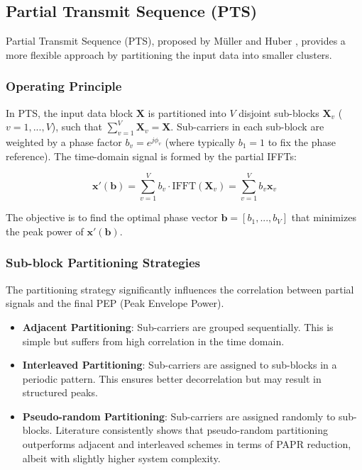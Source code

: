 \documentclass[12pt, a4paper, onecolumn]{article}
\begin{document}
\subsection{Partial Transmit Sequence (PTS)}
Partial Transmit Sequence (PTS), proposed by Müller and Huber \cite{ref6}, provides a more flexible approach by partitioning the input data into smaller clusters.

\subsubsection{Operating Principle}
In PTS, the input data block $\mathbf{X}$ is partitioned into $V$ disjoint sub-blocks $\mathbf{X}_v$ ($v=1, ..., V$), such that $\sum_{v=1}^{V} \mathbf{X}_v = \mathbf{X}$. Sub-carriers in each sub-block are weighted by a phase factor $b_v = e^{j\phi_v}$ (where typically $b_1=1$ to fix the phase reference). The time-domain signal is formed by the partial IFFTs:

\begin{equation}
    \mathbf{x}'(\mathbf{b}) = \sum_{v=1}^{V} b_v \cdot \text{IFFT}(\mathbf{X}_v) = \sum_{v=1}^{V} b_v \mathbf{x}_v
\end{equation}

The objective is to find the optimal phase vector $\mathbf{b} = [b_1, ..., b_V]$ that minimizes the peak power of $\mathbf{x}'(\mathbf{b})$.

\subsubsection{Sub-block Partitioning Strategies}
The partitioning strategy significantly influences the correlation between partial signals and the final PEP (Peak Envelope Power).

\begin{itemize}
    \item \textbf{Adjacent Partitioning}: Sub-carriers are grouped sequentially. This is simple but suffers from high correlation in the time domain.
    \item \textbf{Interleaved Partitioning}: Sub-carriers are assigned to sub-blocks in a periodic pattern. This ensures better decorrelation but may result in structured peaks.
    \item \textbf{Pseudo-random Partitioning}: Sub-carriers are assigned randomly to sub-blocks. Literature consistently shows that pseudo-random partitioning outperforms adjacent and interleaved schemes in terms of PAPR reduction, albeit with slightly higher system complexity.
\end{itemize}
\end{document}
